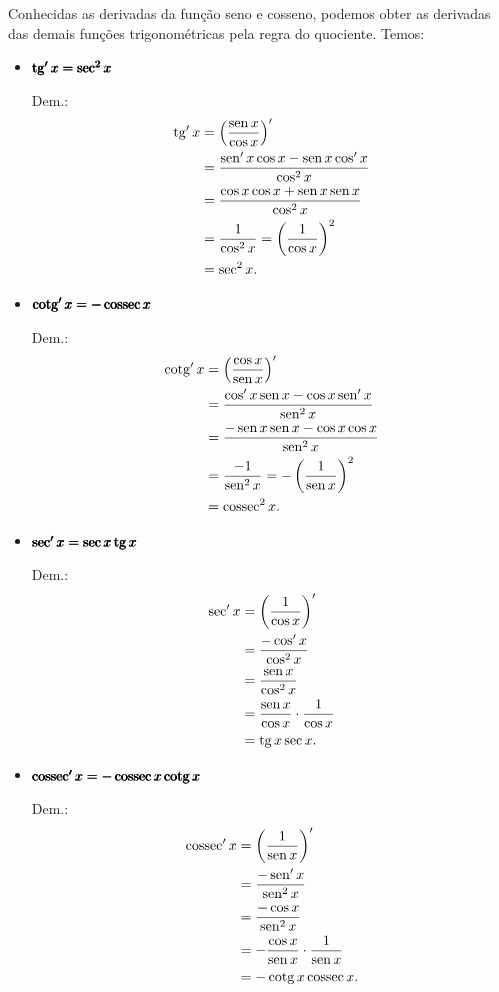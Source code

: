 Conhecidas as derivadas da função seno e cosseno, podemos obter as derivadas das demais funções trigonométricas pela regra do quociente. Temos:
\begin{itemize}
\item $\pmb{\operatorname{tg}' x = \sec^2 x}$

  Dem.:
  \begin{align}
    \operatorname{tg} ' x &= \left(\frac{\operatorname{sen} x}{\cos x}\right)'\\
            &= \frac{\operatorname{sen}' x\cos x - \operatorname{sen} x\cos' x}{\cos^2 x} \\
            &= \frac{\cos x\cos x + \operatorname{sen} x\operatorname{sen} x}{\cos^2 x} \\
            &= \frac{1}{\cos^2 x} = \left(\frac{1}{\cos x}\right)^2 \\
            &= \sec^2 x.
  \end{align}

\item $\pmb{\operatorname{cotg}' x = -\operatorname{cossec} x}$

  Dem.:
  \begin{align}
    \operatorname{cotg} ' x &= \left(\frac{\cos x}{\operatorname{sen} x}\right)'\\
            &= \frac{\cos' x\operatorname{sen} x - \cos x\operatorname{sen}' x}{\operatorname{sen}^2 x} \\
            &= \frac{-\operatorname{sen} x\operatorname{sen} x - \cos x\cos x}{\operatorname{sen}^2 x} \\
            &= \frac{-1}{\operatorname{sen}^2 x} = -\left(\frac{1}{\operatorname{sen} x}\right)^2 \\
            &= \operatorname{cossec}^2 x.
  \end{align}

\item $\pmb{\sec' x = \sec x\operatorname{tg} x}$

  Dem.:
  \begin{align}
    \sec ' x &= \left(\frac{1}{\cos x}\right)'\\
            &= \frac{-\cos' x}{\cos^2 x} \\
            &= \frac{\operatorname{sen} x}{\cos^2 x} \\
            &= \frac{\operatorname{sen} x}{\cos x}\cdot \frac{1}{\cos x} \\
            &= \operatorname{tg} x\sec x.
  \end{align}

\item $\pmb{\operatorname{cossec}' x = -\operatorname{cossec} x\operatorname{cotg} x}$

  Dem.:
  \begin{align}
    \operatorname{cossec} ' x &= \left(\frac{1}{\operatorname{sen} x}\right)'\\
            &= \frac{-\operatorname{sen}' x}{\operatorname{sen}^2 x} \\
            &= \frac{-\cos x}{\operatorname{sen}^2 x} \\
            &= -\frac{\cos x}{\operatorname{sen} x}\cdot \frac{1}{\operatorname{sen} x} \\
            &= -\operatorname{cotg} x\operatorname{cossec} x.
  \end{align}
\end{itemize}

